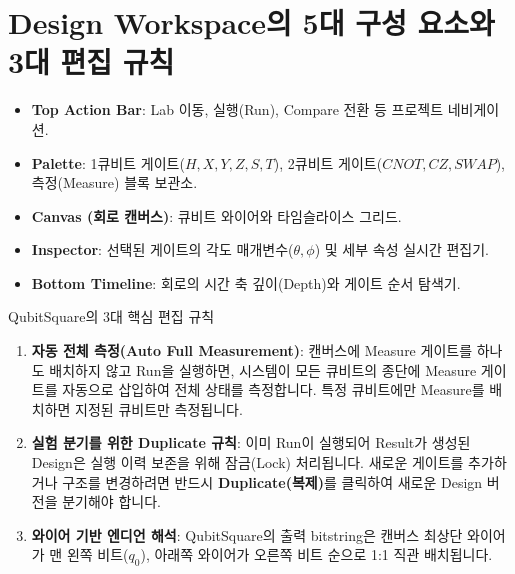 \documentclass[11pt, a4paper]{article}
\theoremstyle{definition}
\begin{document}
\section{Design Workspace의 5대 구성 요소와 3대 편집 규칙}
\begin{itemize}
    \item \textbf{Top Action Bar}: Lab 이동, 실행(Run), Compare 전환 등 프로젝트 네비게이션.
    \item \textbf{Palette}: 1큐비트 게이트($H, X, Y, Z, S, T$), 2큐비트 게이트($CNOT, CZ, SWAP$), 측정(Measure) 블록 보관소.
    \item \textbf{Canvas (회로 캔버스)}: 큐비트 와이어와 타임슬라이스 그리드.
    \item \textbf{Inspector}: 선택된 게이트의 각도 매개변수($\theta, \phi$) 및 세부 속성 실시간 편집기.
    \item \textbf{Bottom Timeline}: 회로의 시간 축 깊이(Depth)와 게이트 순서 탐색기.
\end{itemize}

\begin{notebox}{QubitSquare의 3대 핵심 편집 규칙}
\begin{enumerate}
    \item \textbf{자동 전체 측정(Auto Full Measurement)}: 캔버스에 Measure 게이트를 하나도 배치하지 않고 Run을 실행하면, 시스템이 모든 큐비트의 종단에 Measure 게이트를 자동으로 삽입하여 전체 상태를 측정합니다. 특정 큐비트에만 Measure를 배치하면 지정된 큐비트만 측정됩니다.
    \item \textbf{실험 분기를 위한 Duplicate 규칙}: 이미 Run이 실행되어 Result가 생성된 Design은 실행 이력 보존을 위해 잠금(Lock) 처리됩니다. 새로운 게이트를 추가하거나 구조를 변경하려면 반드시 \textbf{Duplicate(복제)}를 클릭하여 새로운 Design 버전을 분기해야 합니다.
    \item \textbf{와이어 기반 엔디언 해석}: QubitSquare의 출력 bitstring은 캔버스 최상단 와이어가 맨 왼쪽 비트($q_0$), 아래쪽 와이어가 오른쪽 비트 순으로 1:1 직관 배치됩니다.
\end{enumerate}
\end{notebox}

\end{document}
